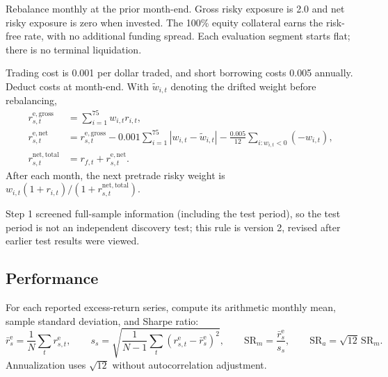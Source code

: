\documentclass[11pt]{article}
\newcommand{\ex}{\mathrm{e}}
\begin{document}
Rebalance monthly at the prior month-end. Gross risky exposure is 2.0 and net
risky exposure is zero when invested. The 100\% equity collateral earns the
risk-free rate, with no additional funding spread. Each evaluation segment starts
flat; there is no terminal liquidation.

Trading cost is 0.001 per dollar traded, and short borrowing costs 0.005 annually.
Deduct costs at month-end. With $\widetilde w_{i,t}$ denoting the drifted weight
before rebalancing,
\begin{equation}
\begin{aligned}
 r^{\ex,\mathrm{gross}}_{s,t}
    &=\sum_{i=1}^{75}w_{i,t}r_{i,t},\\
 r^{\ex,\mathrm{net}}_{s,t}
    &=r^{\ex,\mathrm{gross}}_{s,t}
      -0.001\sum_{i=1}^{75}|w_{i,t}-\widetilde w_{i,t}|
      -\frac{0.005}{12}\sum_{i:w_{i,t}<0}(-w_{i,t}),\\
 r^{\mathrm{net,total}}_{s,t}
    &=r_{f,t}+r^{\ex,\mathrm{net}}_{s,t}.
\end{aligned}
\label{eq:strategy-return}
\end{equation}
After each month, the next pretrade risky weight is
$w_{i,t}(1+r_{i,t})/(1+r^{\mathrm{net,total}}_{s,t})$.

Step 1 screened full-sample information (including the test period), so the test
period is not an independent discovery test; this rule is version 2, revised
after earlier test results were viewed.

\clearpage
\subsection*{Performance}

For each reported excess-return series, compute its arithmetic monthly mean,
sample standard deviation, and Sharpe ratio:
\begin{equation}
 \bar r^{\ex}_s=\frac{1}{N}\sum_t r^{\ex}_{s,t},\qquad
 s_s=\sqrt{\frac{1}{N-1}\sum_t(r^{\ex}_{s,t}-\bar r^{\ex}_s)^2},\qquad
 \mathrm{SR}_{m}=\frac{\bar r^{\ex}_s}{s_s},\qquad
 \mathrm{SR}_{a}=\sqrt{12}\,\mathrm{SR}_{m}.
 \label{eq:performance}
\end{equation}
Annualization uses $\sqrt{12}$ without autocorrelation adjustment.
\end{document}

